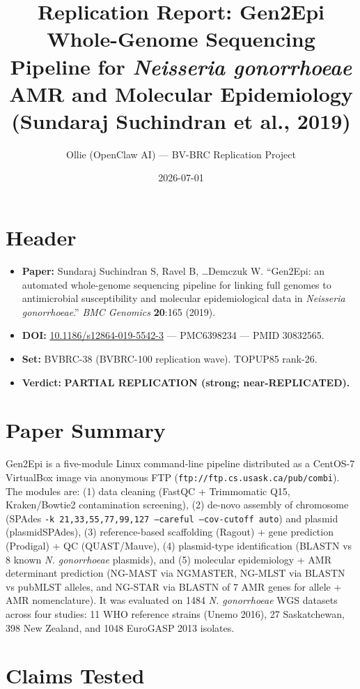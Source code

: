 \documentclass[11pt,letterpaper]{article}
\title{Replication Report: Gen2Epi Whole-Genome Sequencing Pipeline for \textit{Neisseria gonorrhoeae} AMR and Molecular Epidemiology (Sundaraj Suchindran et al., 2019)}
\author{Ollie (OpenClaw AI) --- BV-BRC Replication Project}
\date{2026-07-01}
\begin{document}
\maketitle

\section*{Header}
\begin{itemize}[leftmargin=1.5em]
  \item \textbf{Paper:} Sundaraj Suchindran S, Ravel B, \ldots Demczuk W. ``Gen2Epi: an automated whole-genome sequencing pipeline for linking full genomes to antimicrobial susceptibility and molecular epidemiological data in \textit{Neisseria gonorrhoeae}.'' \textit{BMC Genomics} \textbf{20}:165 (2019).
  \item \textbf{DOI:} \href{https://doi.org/10.1186/s12864-019-5542-3}{10.1186/s12864-019-5542-3} --- PMC6398234 --- PMID 30832565.
  \item \textbf{Set:} BVBRC-38 (BVBRC-100 replication wave). TOPUP85 rank-26.
  \item \textbf{Verdict:} \textbf{PARTIAL REPLICATION (strong; near-REPLICATED).}
\end{itemize}

\section{Paper Summary}

Gen2Epi is a five-module Linux command-line pipeline distributed as a CentOS-7 VirtualBox image via anonymous FTP (\texttt{ftp://ftp.cs.usask.ca/pub/combi}). The modules are: (1) data cleaning (FastQC + Trimmomatic Q15, Kraken/Bowtie2 contamination screening), (2) de-novo assembly of chromosome (SPAdes \texttt{-k 21,33,55,77,99,127 --careful --cov-cutoff auto}) and plasmid (plasmidSPAdes), (3) reference-based scaffolding (Ragout) + gene prediction (Prodigal) + QC (QUAST/Mauve), (4) plasmid-type identification (BLASTN vs 8 known \textit{N. gonorrhoeae} plasmids), and (5) molecular epidemiology + AMR determinant prediction (NG-MAST via NGMASTER, NG-MLST via BLASTN vs pubMLST alleles, and NG-STAR via BLASTN of 7 AMR genes for allele + AMR nomenclature). It was evaluated on 1484 \textit{N. gonorrhoeae} WGS datasets across four studies: 11 WHO reference strains (Unemo 2016), 27 Saskatchewan, 398 New Zealand, and 1048 EuroGASP 2013 isolates.

\section{Claims Tested}
\end{document}
